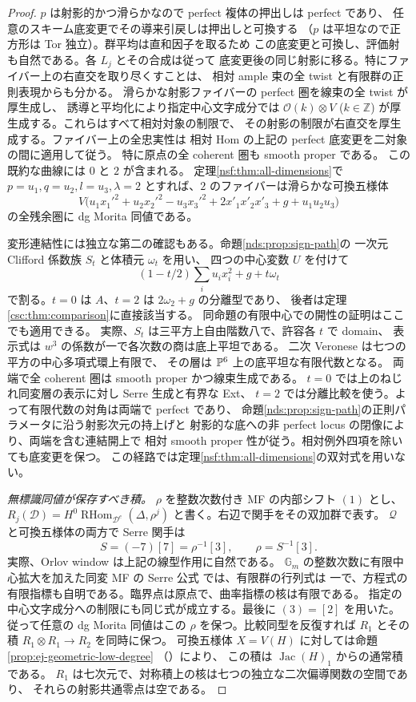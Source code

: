 \begin{proof}
$p$ は射影的かつ滑らかなので perfect 複体の押出しは perfect であり、
任意のスキーム底変更でその導来引戻しは押出しと可換する
（$p$ は平坦なので正方形は Tor 独立）。群平均は直和因子を取るため
この底変更と可換し、評価射も自然である。各 $L_j$ とその合成は従って
底変更後の同じ射影に移る。特にファイバー上の右直交を取り尽くすことは、
相対 ample 束の全 twist と有限群の正則表現からも分かる。
滑らかな射影ファイバーの perfect 圏を線束の全 twist が厚生成し、
誘導と平均化により指定中心文字成分では $\mathcal O(k)\otimes V$
($k\in\mathbb Z$) が厚生成する。これらはすべて相対対象の制限で、
その射影の制限が右直交を厚生成する。ファイバー上の全忠実性は
相対 Hom の上記の perfect 底変更を二対象の間に適用して従う。
特に原点の全 coherent 圏も smooth proper である。
この既約な曲線には $0$ と $2$ が含まれる。
定理\ref{nsf:thm:all-dimensions}で $p=u_1,q=u_2,l=u_3,\lambda=2$
とすれば、$2$ のファイバーは滑らかな可換五様体
\[
 V\bigl(u_1x_1'^2+u_2x_2'^2-u_3x_3'^2
          +2x'_1x'_2x'_3+g+u_1u_2u_3\bigr)
\]
の全残余圏に dg Morita 同値である。

変形連結性には独立な第二の確認もある。命題\ref{nds:prop:sign-path}の
一次元 Clifford 係数族 $S_t$ と体積元 $\omega_t$ を用い、
四つの中心変数 $U$ を付けて
\[
 (1-t/2)\sum_i u_ix_i^2+g+t\omega_t
\]
で割る。$t=0$ は $A$、$t=2$ は $2\omega_2+g$ の分離型であり、
後者は定理\ref{csc:thm:comparison}に直接該当する。
同命題の有限中心での開性の証明はここでも適用できる。
実際、$S_t$ は三平方上自由階数八で、許容各 $t$ で domain、
表示式は $w^3$ の係数が一で各次数の商は底上平坦である。
二次 Veronese は七つの平方の中心多項式環上有限で、
その層は $\mathbb P^6$ 上の底平坦な有限代数となる。
両端で全 coherent 圏は smooth proper かつ線束生成である。
$t=0$ では上のねじれ同変層の表示に対し Serre 生成と有界な Ext、
$t=2$ では分離比較を使う。よって有限代数の対角は両端で perfect であり、
命題\ref{nds:prop:sign-path}の正則パラメータに沿う射影次元の持上げと
射影的な底への非 perfect locus の閉像により、両端を含む連結開上で
相対 smooth proper 性が従う。相対例外四項を除いても底変更を保つ。
この経路では定理\ref{nsf:thm:all-dimensions}の双対式を用いない。

\emph{無標識同値が保存すべき積。}
$\rho$ を整数次数付き MF の内部シフト $(1)$ とし、
$R_j(\mathcal D)=H^0\operatorname{RHom}_{\mathcal D^e}
(\Delta,\rho^j)$ と書く。右辺で関手をその双加群で表す。
$\mathcal Q$ と可換五様体の両方で Serre 関手は
\[
 S=(-7)[7]=\rho^{-1}[3],\qquad \rho=S^{-1}[3].
\]
実際、Orlov window は上記の線型作用に自然である。
$\mathbb G_m$ の整数次数に有限中心拡大を加えた同変 MF の
Serre 公式 \cite[Theorem~2.18]{NQRFaveroKelly}では、有限群の行列式は
一で、方程式の有限指標も自明である。臨界点は原点で、曲率指標の核は有限である。
指定の中心文字成分への制限にも同じ式が成立する。最後に $(3)=[2]$ を用いた。
従って任意の dg Morita 同値はこの $\rho$ を保つ。比較同型を反復すれば
$R_1$ とその積 $R_1\otimes R_1\to R_2$ を同時に保つ。
可換五様体 $X=V(H)$ に対しては命題\ref{prop:ej-geometric-low-degree}
（\cite[Theorem~3.5, Remark~3.6, Proposition~3.7]{LZ}）により、
この積は $\operatorname{Jac}(H)_1$ からの通常積である。
$R_1$ は七次元で、対称積上の核は七つの独立な二次偏導関数の空間であり、
それらの射影共通零点は空である。


\end{proof}
